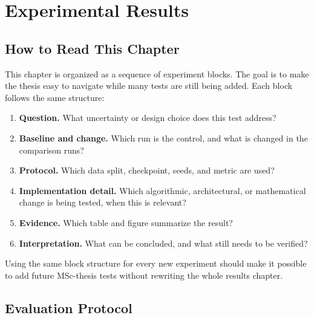 \chapter{Experimental Results}
\label{ch:experimental-results}

\section{How to Read This Chapter}
\label{sec:results-structure}

This chapter is organized as a sequence of experiment blocks. The goal is to
make the thesis easy to navigate while many tests are still being added. Each
block follows the same structure:

\begin{enumerate}
  \item \textbf{Question.} What uncertainty or design choice does this test
  address?
  \item \textbf{Baseline and change.} Which run is the control, and what is
  changed in the comparison runs?
  \item \textbf{Protocol.} Which data split, checkpoint, seeds, and metric are
  used?
  \item \textbf{Implementation detail.} Which algorithmic, architectural, or
  mathematical change is being tested, when this is relevant?
  \item \textbf{Evidence.} Which table and figure summarize the result?
  \item \textbf{Interpretation.} What can be concluded, and what still needs to
  be verified?
\end{enumerate}

Using the same block structure for every new experiment should make it possible
to add future MSc-thesis tests without rewriting the whole results chapter.

\section{Evaluation Protocol}
\label{sec:results-evaluation-protocol}

